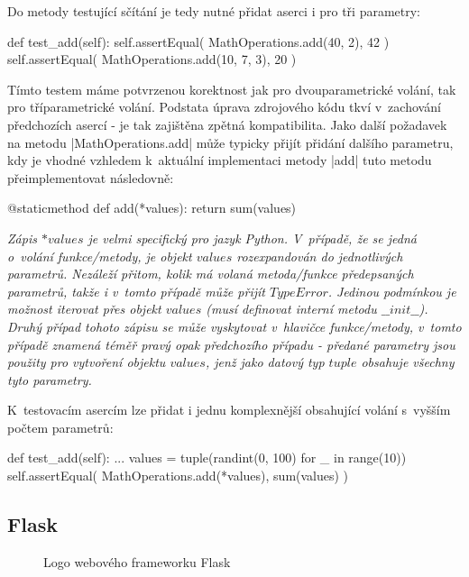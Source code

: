 Do metody testující sčítání je tedy nutné přidat aserci i pro tři parametry:

\begin{code}[caption={Testovací metoda pro vylepšenou $MathOperations.add$}]
def test_add(self):
	self.assertEqual(
		MathOperations.add(40, 2),
		42
	)
	self.assertEqual(
		MathOperations.add(10, 7, 3),
		20
	)
\end{code}

\begin{sloppypar}
	Tímto testem máme potvrzenou korektnost jak pro dvouparametrické volání, tak pro  tříparametrické volání. Podstata úprava zdrojového kódu tkví v~zachování předchozích asercí - je tak zajištěna zpětná kompatibilita. Jako další požadavek na metodu \ic|MathOperations.add| může typicky přijít přidání dalšího parametru, kdy je vhodné vzhledem k~aktuální implementaci metody \ic|add| tuto metodu přeimplementovat následovně:
\end{sloppypar}

\begin{code}[caption={Finální implementace metody $MathOperations.add$}]
@staticmethod
def add(*values):
	return sum(values)
\end{code}

\textit{
  Zápis $*values$ je velmi specifický pro jazyk Python. V~případě, že se jedná o~volání funkce/metody, je objekt $values$ rozexpandován do jednotlivých parametrů. Nezáleží přitom, kolik má volaná metoda/funkce předepsaných parametrů, takže i v~tomto případě může přijít $TypeError$. Jedinou podmínkou je možnost iterovat přes objekt $values$ (musí definovat interní metodu $\_\_init\_\_$). \\Druhý případ tohoto zápisu se může vyskytovat v~hlavičce funkce/metody, v~tomto případě znamená téměř pravý opak předchozího případu - předané parametry jsou použity pro vytvoření objektu $values$, jenž jako datový typ $tuple$ obsahuje všechny tyto parametry. 
}

K~testovacím asercím lze přidat i jednu komplexnější obsahující volání s~vyšším počtem parametrů:

\begin{code}[caption={Finální test pro metodu $MathOperations.add$}]
def test_add(self):
	...
	values = tuple(randint(0, 100) for _ in range(10))
	self.assertEqual(
		MathOperations.add(*values),
		sum(values)
	)

\end{code}

\subsection{Flask}
\label{subsec:flask}
\begin{wrapfigure}[16]{R}{\textwidth/3}
    \centering
    
    \caption{Logo webového frameworku Flask}
\end{wrapfigure}

